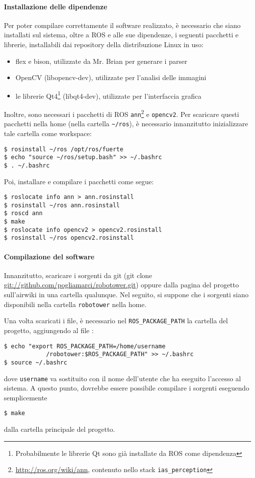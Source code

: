 \paragraph{Installazione delle dipendenze} Per poter compilare correttamente il software realizzato, è necessario che siano installati sul sistema, oltre a ROS e alle sue dipendenze, i seguenti pacchetti e librerie, installabili dai repository della distribuzione Linux in uso:
\begin{itemize}
\item flex e bison, utilizzate da Mr. Brian per generare i parser
\item OpenCV (libopencv-dev), utilizzate per l'analisi delle immagini
\item le librerie Qt4\footnote{Probabilmente le librerie Qt sono già installate da ROS come dipendenza} (libqt4-dev), utilizzate per l'interfaccia grafica
\end{itemize}
Inoltre, sono necessari i pacchetti di ROS \verb|ann|\footnote{\url{http://ros.org/wiki/ann}, contenuto nello stack \texttt{ias\_perception}} e \verb|opencv2|. Per scaricare questi pacchetti nella home (nella cartella \verb|~/ros|), è necessario innanzitutto inizializzare tale cartella come workspace:
\begin{verbatim}
$ rosinstall ~/ros /opt/ros/fuerte
$ echo "source ~/ros/setup.bash" >> ~/.bashrc
$ . ~/.bashrc
\end{verbatim}
Poi, installare e compilare i pacchetti come segue:
\begin{verbatim}
$ roslocate info ann > ann.rosinstall
$ rosinstall ~/ros ann.rosinstall
$ roscd ann
$ make
$ roslocate info opencv2 > opencv2.rosinstall
$ rosinstall ~/ros opencv2.rosinstall
\end{verbatim}
\paragraph{Compilazione del software} Innanzitutto, scaricare i sorgenti da git (git clone \url{git://github.com/pogliamarci/robotower.git}) oppure dalla pagina del progetto sull'airwiki in una cartella qualunque. Nel seguito, si suppone che i sorgenti siano disponibili nella cartella \verb|robotower| nella home.

Una volta scaricati i file, è necessario nel \verb|ROS_PACKAGE_PATH| la cartella del progetto, aggiungendo al file :
\begin{verbatim}
$ echo "export ROS_PACKAGE_PATH=/home/username
            /robotower:$ROS_PACKAGE_PATH" >> ~/.bashrc
$ source ~/.bashrc
\end{verbatim}
dove \verb|username| va sostituito con il nome dell'utente che ha eseguito l'accesso al sistema.
A questo punto, dovrebbe essere possibile compilare i sorgenti eseguendo semplicemente
\begin{verbatim}
$ make
\end{verbatim}
dalla cartella principale del progetto.

